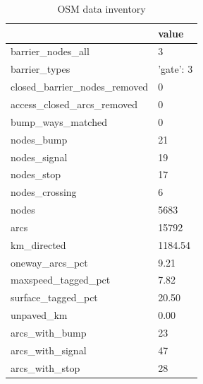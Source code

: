 \begin{table}
\caption{OSM data inventory}
\label{tab:T1_inventory}
\begin{tabular}{ll}
\toprule
 & value \\
\midrule
barrier_nodes_all & 3 \\
barrier_types & {'gate': 3} \\
closed_barrier_nodes_removed & 0 \\
access_closed_arcs_removed & 0 \\
bump_ways_matched & 0 \\
nodes_bump & 21 \\
nodes_signal & 19 \\
nodes_stop & 17 \\
nodes_crossing & 6 \\
nodes & 5683 \\
arcs & 15792 \\
km_directed & 1184.54 \\
oneway_arcs_pct & 9.21 \\
maxspeed_tagged_pct & 7.82 \\
surface_tagged_pct & 20.50 \\
unpaved_km & 0.00 \\
arcs_with_bump & 23 \\
arcs_with_signal & 47 \\
arcs_with_stop & 28 \\
\bottomrule
\end{tabular}
\end{table}
